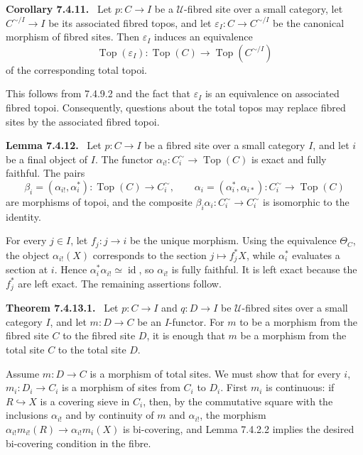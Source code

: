 \documentclass[11pt]{article}
\newcommand{\U}{\mathcal{U}}
\newcommand{\Top}{\operatorname{Top}}
\newcommand{\id}{\operatorname{id}}
\newenvironment{statement}[1]{\par\medskip\noindent\textbf{#1.}\ }{\par\medskip}
\begin{document}
\begin{statement}{Corollary 7.4.11}
Let \(p:C\to I\) be a \(\U\)-fibred site over a small category, let \(C^{\sim/I}\to I\) be its associated fibred topos, and let \(\varepsilon_I:C\to C^{\sim/I}\) be the canonical morphism of fibred sites. Then \(\varepsilon_I\) induces an equivalence
\[
 \Top(\varepsilon_I):\Top(C)\to\Top(C^{\sim/I})
\]
of the corresponding total topoi.
\end{statement}

This follows from 7.4.9.2 and the fact that \(\varepsilon_I\) is an equivalence on associated fibred topoi. Consequently, questions about the total topos may replace fibred sites by the associated fibred topoi.

\begin{statement}{Lemma 7.4.12}
Let \(p:C\to I\) be a fibred site over a small category \(I\), and let \(i\) be a final object of \(I\). The functor \(\alpha_{i!}:C_i^{\sim}\to\Top(C)\) is exact and fully faithful. The pairs
\[
 \beta_i=(\alpha_{i!},\alpha_i^*):\Top(C)\to C_i^{\sim},
 \qquad
 \alpha_i=(\alpha_i^*,\alpha_{i*}):C_i^{\sim}\to\Top(C)
\]
are morphisms of topoi, and the composite \(\beta_i\alpha_i:C_i^{\sim}\to C_i^{\sim}\) is isomorphic to the identity.
\end{statement}

For every \(j\in I\), let \(f_j:j\to i\) be the unique morphism. Using the equivalence \(\Theta_C\), the object \(\alpha_{i!}(X)\) corresponds to the section \(j\mapsto f_j^*X\), while \(\alpha_i^*\) evaluates a section at \(i\). Hence \(\alpha_i^*\alpha_{i!}\simeq\id\), so \(\alpha_{i!}\) is fully faithful. It is left exact because the \(f_j^*\) are left exact. The remaining assertions follow.

\begin{statement}{Theorem 7.4.13.1}
Let \(p:C\to I\) and \(q:D\to I\) be \(\U\)-fibred sites over a small category \(I\), and let \(m:D\to C\) be an \(I\)-functor. For \(m\) to be a morphism from the fibred site \(C\) to the fibred site \(D\), it is enough that \(m\) be a morphism from the total site \(C\) to the total site \(D\).
\end{statement}

Assume \(m:D\to C\) is a morphism of total sites. We must show that for every \(i\), \(m_i:D_i\to C_i\) is a morphism of sites from \(C_i\) to \(D_i\). First \(m_i\) is continuous: if \(R\hookrightarrow X\) is a covering sieve in \(C_i\), then, by the commutative square with the inclusions \(\alpha_{i!}\) and by continuity of \(m\) and \(\alpha_{i!}\), the morphism \(\alpha_{i!}m_{i!}(R)\to\alpha_{i!}m_i(X)\) is bi-covering, and Lemma 7.4.2.2 implies the desired bi-covering condition in the fibre.
\end{document}
